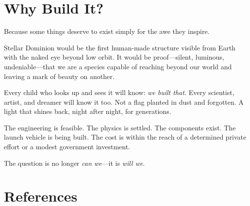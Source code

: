 \documentclass[10pt,letterpaper]{article}
\begin{document}
\begin{figure}[!ht]

\end{figure}

\section{Why Build It?}

Because some things deserve to exist simply for the awe they inspire.

Stellar Dominion would be the first human-made structure visible from Earth with
the naked eye beyond low orbit. It would be proof---silent, luminous,
undeniable---that we are a species capable of reaching beyond our world and
leaving a mark of beauty on another.

\begin{emeraldquote}
  Every child who looks up and sees it will know: \textit{we built that.}
  Every scientist, artist, and dreamer will know it too. Not a flag planted in
  dust and forgotten. A light that shines back, night after night, for
  generations.
\end{emeraldquote}

The engineering is feasible. The physics is settled. The components exist. The
launch vehicle is being built. The cost is within the reach of a determined
private effort or a modest government investment.

The question is no longer \textit{can we}---it is \textit{will we}.

\section*{References}
\end{document}
